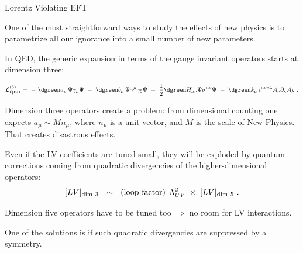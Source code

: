 \documentclass[pdf,PItalk,slideColor,colorBG,accumulate]{prosper}
\newcommand{\myit}{\usefont{T1}{ppl}{m}{it}\fontsize{8pt}{6pt}\selectfont}
\begin{document}

{
\begin{slide}{\small Lorentz Violating EFT}
{}
{
}

	One of the most straightforward ways to study the effects of
	new physics is to parametrize all our ignorance into a small 
	number of new parameters.

	In QED, the generic expansion in terms of the gauge invariant 
	operators starts at dimension {\red three}:

\[
\nonumber
{\cal L}_{\rm QED}^{(3)} =
~-~{\dgreen a_\mu}\,  \bar \Psi \gamma_\mu \Psi
~-~ {\dgreen b_\mu}\,  \bar \Psi \gamma^\mu \gamma_5 \Psi 
~-~ \frac{1}{2}{\dgreen H_{\mu\nu}}\bar \Psi \sigma^{\mu\nu} \Psi
~-~ {\dgreen k_\mu}\,  
\epsilon^{\mu\nu\kappa\lambda} A_\nu \partial_\kappa A_\lambda~.
\]

	Dimension three operators create a problem:
	from dimensional counting one expects 
	{\blue $ a_\mu \sim M n_\mu $}, 
	where {\blue $ n_\mu $} is a unit vector, and
	$ M $ is the scale of New Physics.
	That creates {\myit\blue disastrous} effects.

	Even if the LV coefficients are tuned small, they will be 
	exploded by quantum corrections coming from quadratic divergencies
	of the higher-dimensional operators:
\[
[LV]_{\rm dim~3} ~~\sim~~ ({\rm loop~factor}) \, 
\;\Lambda_{UV}^2\;
\times\; [LV]_{{\rm dim}~5}~. 
\]

	Dimension five operators have to be tuned too \quad
	$ \Longrightarrow $ \quad no room for LV interactions.

	One of the solutions is if such quadratic divergencies
	are suppressed by a {\red symmetry}.

\end{slide}
}
\end{document}
